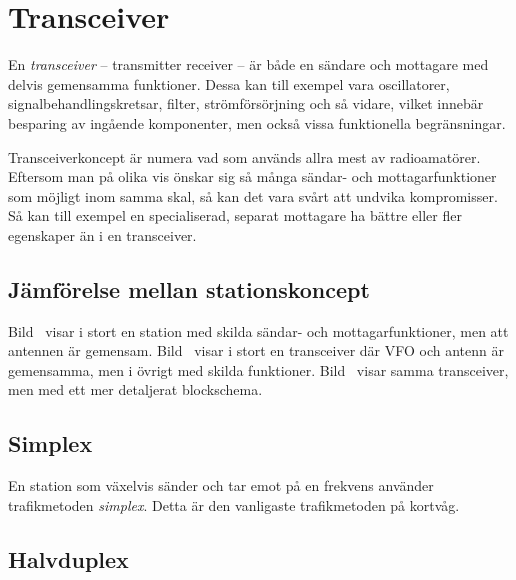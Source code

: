 \newpage
{}


\section{Transceiver}

En \emph{transceiver} -- transmitter receiver -- är både en sändare och
mottagare med delvis gemensamma funktioner.
Dessa kan till exempel vara oscillatorer, signalbehandlingskretsar, filter,
strömförsörjning och så vidare, vilket innebär besparing av ingående
komponenter, men också vissa funktionella begränsningar.

Transceiverkoncept är numera vad som används allra mest av radioamatörer.
Eftersom man på olika vis önskar sig så många sändar- och mottagarfunktioner
som möjligt inom samma skal, så kan det vara svårt att undvika kompromisser.
Så kan till exempel en specialiserad, separat mottagare ha bättre eller fler
egenskaper än i en transceiver.

\subsection{Jämförelse mellan stationskoncept}

Bild~ visar i stort en station med skilda sändar- och
mottagarfunktioner, men att antennen är gemensam.
Bild~ visar i stort en transceiver där VFO och antenn är
gemensamma, men i övrigt med skilda funktioner.
Bild~ visar samma transceiver, men med ett mer detaljerat
blockschema.


\subsection{Simplex}

En station som växelvis sänder och tar emot på en frekvens använder
trafikmetoden \emph{simplex}.
Detta är den vanligaste trafikmetoden på kortvåg.

\subsection{Halvduplex}


